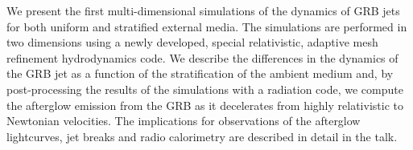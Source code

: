 


\bigskip



\bigskip

\noindent We present the first multi-dimensional simulations of the dynamics of GRB jets for both uniform and stratified external media. The simulations are performed in two dimensions using a newly developed, special relativistic, adaptive mesh refinement hydrodynamics code. 
We describe the differences in the dynamics of the GRB jet as a function of the stratification of the ambient medium and, by post-processing the results of the simulations with a radiation code, we compute the afterglow emission from the GRB as it decelerates from highly relativistic to Newtonian velocities. The implications for observations of the afterglow lightcurves, jet breaks and radio calorimetry are described in detail in the talk.
